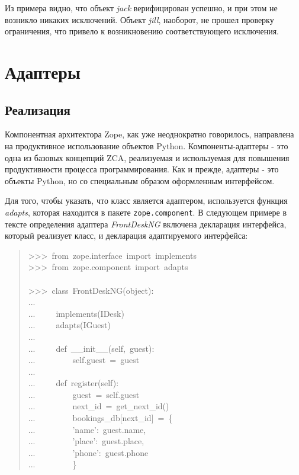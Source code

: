 \documentclass[a4paper,openany,twoside,final]{book}
\providecommand*{\DUroletitlereference}[1]{\textsl{#1}}
\begin{document}
Из примера видно, что объект \DUroletitlereference{jack} верифицирован успешно, и при этом
не возникло никаких исключений.  Объект \DUroletitlereference{jill}, наоборот, не прошел
проверку ограничения, что привело к возникновению соответствующего
исключения.


\chapter{Адаптеры%
  \label{id33}%
}


\section{Реализация%
  \label{id34}%
}

Компонентная архитектора Zope, как уже неоднократно говорилось,
направлена на продуктивное использование объектов Python.
Компоненты-адаптеры - это одна из базовых концепций ZCA, реализуемая и
используемая для повышения продуктивности процесса программирования.
Как и прежде, адаптеры - это объекты Python, но со специальным образом
оформленным интерфейсом.

Для того, чтобы указать, что класс является адаптером, используется
функция \DUroletitlereference{adapts}, которая находится в пакете \texttt{zope.component}.  В
следующем примере в тексте определения адаптера \DUroletitlereference{FrontDeskNG} включена
декларация интерфейса, который реализует класс, и декларация
адаптируемого интерфейса:

\begin{quote}{\ttfamily \raggedright \noindent
>{}>{}>~from~zope.interface~import~implements\\
>{}>{}>~from~zope.component~import~adapts\\
~\\
>{}>{}>~class~FrontDeskNG(object):\\
...\\
...~~~~~implements(IDesk)\\
...~~~~~adapts(IGuest)\\
...\\
...~~~~~def~\_\_init\_\_(self,~guest):\\
...~~~~~~~~~self.guest~=~guest\\
...\\
...~~~~~def~register(self):\\
...~~~~~~~~~guest~=~self.guest\\
...~~~~~~~~~next\_id~=~get\_next\_id()\\
...~~~~~~~~~bookings\_db{[}next\_id{]}~=~\{\\
...~~~~~~~~~'name':~guest.name,\\
...~~~~~~~~~'place':~guest.place,\\
...~~~~~~~~~'phone':~guest.phone\\
...~~~~~~~~~\}
}
\end{quote}
\end{document}
